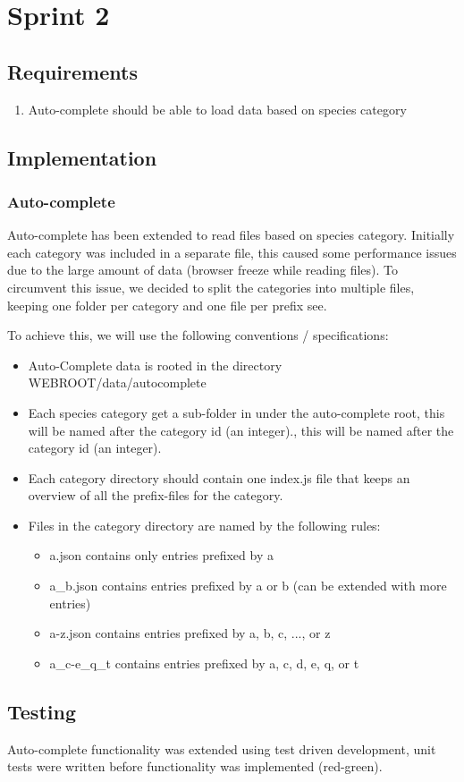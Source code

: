 \section{Sprint 2}

\subsection{Requirements}

\begin{enumerate}
	\item Auto-complete should be able to load data based on species category
\end{enumerate}

\subsection{Implementation}


	\subsubsection{Auto-complete}

	Auto-complete has been extended to read files based on species category.
	Initially each category was included in a separate file, this caused some
	performance issues due to the large amount of data (browser freeze while reading
	files). To circumvent this issue, we decided to split the categories into
	multiple files, keeping one folder per category and one file per prefix see.

	To achieve this, we will use the following conventions / specifications:

	\begin{itemize}
		\item Auto-Complete data is rooted in the directory WEBROOT/data/autocomplete
		\item Each species category get a sub-folder in under the auto-complete
		root, this will be named after the category id (an integer)., this will
		be named after the category id (an integer).
		\item Each category directory should contain one index.js file that
		keeps an overview of all the prefix-files for the category.
		\item Files in the category directory are named by the following rules:
			\begin{itemize}
				\item a.json contains only entries prefixed by a
				\item a\_b.json contains entries prefixed by a or b (can be
				extended with more entries)
				\item a-z.json contains entries prefixed by a, b, c, ..., or z
				\item a\_c-e\_q\_t contains entries prefixed by a, c, d, e, q, or t
			\end{itemize}
	\end{itemize}

\subsection{Testing}

Auto-complete functionality was extended using test driven development, unit
tests were written before functionality was implemented (red-green).
